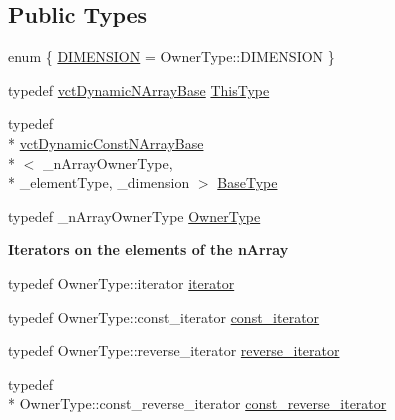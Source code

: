 \subsection*{Public Types}
\begin{DoxyCompactItemize}
\item 
enum \{ \hyperlink{classvct_dynamic_n_array_base_aa66532d28588bdf26d08fb593db815d6abfcde386ec801b212d7c42d63a4f3837}{D\-I\-M\-E\-N\-S\-I\-O\-N} = Owner\-Type\-:\-:D\-I\-M\-E\-N\-S\-I\-O\-N
 \}
\item 
typedef \hyperlink{classvct_dynamic_n_array_base}{vct\-Dynamic\-N\-Array\-Base} \hyperlink{classvct_dynamic_n_array_base_a22ffd87e54134c364487952ce7d84dd5}{This\-Type}
\item 
typedef \\*
\hyperlink{classvct_dynamic_const_n_array_base}{vct\-Dynamic\-Const\-N\-Array\-Base}\\*
$<$ \-\_\-n\-Array\-Owner\-Type, \\*
\-\_\-element\-Type, \-\_\-dimension $>$ \hyperlink{classvct_dynamic_n_array_base_ac2c95af53fa85b36f67bdc9ffe0d1737}{Base\-Type}
\item 
typedef \-\_\-n\-Array\-Owner\-Type \hyperlink{classvct_dynamic_n_array_base_a856048c87677204bd0338cce0e14abf6}{Owner\-Type}
\end{DoxyCompactItemize}
\begin{Indent}{\bf Iterators on the elements of the n\-Array}\par
\begin{DoxyCompactItemize}
\item 
typedef Owner\-Type\-::iterator \hyperlink{classvct_dynamic_n_array_base_afe6d2a8cd86a6b3a0828249b976389ba}{iterator}
\item 
typedef Owner\-Type\-::const\-\_\-iterator \hyperlink{classvct_dynamic_n_array_base_a77193963c2949409a70d820f87ba9ddb}{const\-\_\-iterator}
\item 
typedef Owner\-Type\-::reverse\-\_\-iterator \hyperlink{classvct_dynamic_n_array_base_a4a0adcb47fb464b8dd1a1e2495a52468}{reverse\-\_\-iterator}
\item 
typedef \\*
Owner\-Type\-::const\-\_\-reverse\-\_\-iterator \hyperlink{classvct_dynamic_n_array_base_a63dd44f3924be6ea9240772286f7bfd2}{const\-\_\-reverse\-\_\-iterator}
\end{DoxyCompactItemize}
\end{Indent}
